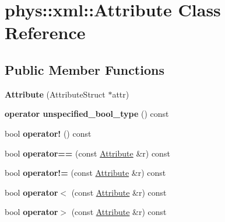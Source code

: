 \hypertarget{classphys_1_1xml_1_1Attribute}{
\section{phys::xml::Attribute Class Reference}
\label{da/ddf/classphys_1_1xml_1_1Attribute}
}
\subsection*{Public Member Functions}
\begin{DoxyCompactItemize}
\item 
\hypertarget{classphys_1_1xml_1_1Attribute_a6786df9d66c675c5a55761a7d3d512a5}{
{\bfseries Attribute} (AttributeStruct $\ast$attr)}
\label{da/ddf/classphys_1_1xml_1_1Attribute_a6786df9d66c675c5a55761a7d3d512a5}

\item 
\hypertarget{classphys_1_1xml_1_1Attribute_a95fb020caed5a4ec9a5248fe38d6f345}{
{\bfseries operator unspecified\_\-bool\_\-type} () const }
\label{da/ddf/classphys_1_1xml_1_1Attribute_a95fb020caed5a4ec9a5248fe38d6f345}

\item 
\hypertarget{classphys_1_1xml_1_1Attribute_afa0b14b5409097f426ced7f2b353f1b8}{
bool {\bfseries operator!} () const }
\label{da/ddf/classphys_1_1xml_1_1Attribute_afa0b14b5409097f426ced7f2b353f1b8}

\item 
\hypertarget{classphys_1_1xml_1_1Attribute_aec8429cea23995f2961bb940b5350792}{
bool {\bfseries operator==} (const \hyperlink{classphys_1_1xml_1_1Attribute}{Attribute} \&r) const }
\label{da/ddf/classphys_1_1xml_1_1Attribute_aec8429cea23995f2961bb940b5350792}

\item 
\hypertarget{classphys_1_1xml_1_1Attribute_a8728dccdafb4da771ce55968154e5a2d}{
bool {\bfseries operator!=} (const \hyperlink{classphys_1_1xml_1_1Attribute}{Attribute} \&r) const }
\label{da/ddf/classphys_1_1xml_1_1Attribute_a8728dccdafb4da771ce55968154e5a2d}

\item 
\hypertarget{classphys_1_1xml_1_1Attribute_a25225938f6b74f0c0aec696ee4c925c6}{
bool {\bfseries operator$<$} (const \hyperlink{classphys_1_1xml_1_1Attribute}{Attribute} \&r) const }
\label{da/ddf/classphys_1_1xml_1_1Attribute_a25225938f6b74f0c0aec696ee4c925c6}

\item 
\hypertarget{classphys_1_1xml_1_1Attribute_ae4761c43b4dbd3bdcf99b172aff6ca8e}{
bool {\bfseries operator$>$} (const \hyperlink{classphys_1_1xml_1_1Attribute}{Attribute} \&r) const }
\label{da/ddf/classphys_1_1xml_1_1Attribute_ae4761c43b4dbd3bdcf99b172aff6ca8e}


\end{DoxyCompactItemize}
